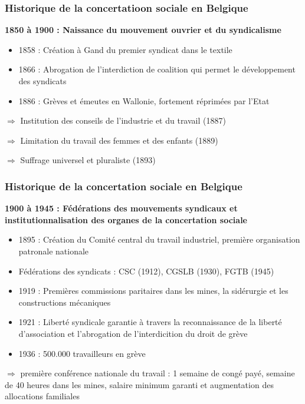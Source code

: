 \documentclass[12pt]{beamer}
\begin{document}
  \begin{frame}
    \frametitle{Historique de la concertatioon sociale en Belgique}
    
    \begin{center} \textbf{1850 à 1900 : Naissance du mouvement ouvrier et du syndicalisme} \end{center}
    
    \begin{itemize}
     \item 1858 : Création à Gand du premier syndicat dans le textile
     \item 1866 : Abrogation de l'interdiction de coalition qui permet le développement des syndicats
     \item 1886 : Grèves et émeutes en Wallonie, fortement réprimées par l'Etat
    \end{itemize}
    
    $\Rightarrow$ Institution des conseils de l'industrie et du travail (1887)
    
    $\Rightarrow$  Limitation du travail des femmes et des enfants (1889)
    
    $\Rightarrow$ Suffrage universel et pluraliste (1893)
  \end{frame}
  
  \begin{frame}
    \frametitle{Historique de la concertation sociale en Belgique}
    
    \textbf{1900 à 1945 : Fédérations des mouvements syndicaux et institutionnalisation des organes de la concertation sociale}
    
    \begin{itemize}
     \item 1895 : Création du Comité central du travail industriel, première organisation patronale nationale
     \item Fédérations des syndicats : CSC (1912), CGSLB (1930), FGTB (1945) 
     \item 1919 : Premières commissions paritaires dans les mines, la sidérurgie et les constructions mécaniques
     \item 1921 : Liberté syndicale garantie à travers la reconnaissance de la liberté d'association et l'abrogation de l'interdicition du droit de grève
     \item 1936 : 500.000 travailleurs en grève
    \end{itemize}
    
    $\Rightarrow$ première conférence nationale du travail : 1 semaine de congé payé, semaine de 40 heures dans les mines, salaire minimum garanti et augmentation des allocations familiales
  \end{frame}
  
\end{document}
